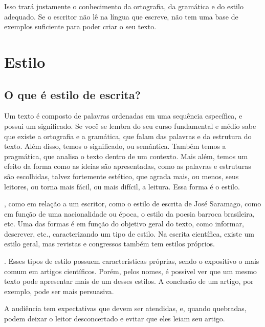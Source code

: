 \documentclass[openany]{book}
\begin{document}
 Isso trará justamente o conhecimento da ortografia, da gramática e do estilo adequado. Se o escritor não lê na língua que escreve, não tem uma base de exemplos suficiente para poder criar o seu texto.


\chapter{Estilo}

\section{O que é estilo de escrita?}

 Um texto é composto de palavras ordenadas em uma sequência específica, e possui um significado. Se você se lembra do seu curso fundamental e médio sabe que existe a ortografia e a gramática, que falam das palavras e da estrutura do texto. Além disso, temos o significado, ou semântica. Também temos a pragmática, que analisa o texto dentro de um contexto. Mais além, temos um efeito da forma como as ideias são apresentadas, como as palavras e estruturas são escolhidas, talvez fortemente estético, que agrada mais, ou menos, seus leitores, ou torna mais fácil, ou mais difícil, a leitura. Essa forma é o estilo.

, como em relação a um escritor, como o estilo de escrita de José Saramago, como em função de uma nacionalidade ou época, o estilo da poesia barroca brasileira, etc. Uma das formas é em função do objetivo geral do texto, como informar, descrever, etc., caracterizando um tipo de estilo. Na escrita científica, existe um estilo geral, mas revistas e congressos também tem estilos próprios.

\citep{jeffrey:2016}. Esses tipos de estilo possuem características próprias, sendo o expositivo o mais comum em artigos científicos. Porém, pelos nomes, é possivel ver que um mesmo texto pode apresentar mais de um desses estilos. A conclusão de um artigo, por exemplo, pode ser mais persuasiva.

 A audiência tem expectativas que devem ser atendidas, e, quando quebradas, podem deixar o leitor desconcertado e evitar que eles leiam seu artigo.
\end{document}
